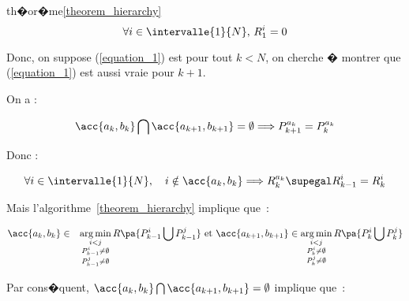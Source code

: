 \begin{xdemo}{th�or�me}{\ref{theorem_hierarchy}}
    $$
    \forall i \in \intervalle{1}{N}, \, R_{1}^i = 0
    $$

Donc, on suppose (\ref{equation_1}) est pour tout $k < N$, on cherche � montrer que (\ref{equation_1}) est aussi vraie pour $k+1$.


\itemdemo
\quad 
{}

On a :

    $$
    \acc{a_k,b_k} \bigcap \acc{a_{k+1},b_{k+1}} = \emptyset \Longrightarrow P_{k+1}^{a_{k}} = P_{k}^{a_{k}}
    $$

Donc :

    \begin{eqnarray}
    \forall i \in \intervalle{1}{N}, \, && 
                             i \notin \acc{a_k,b_k} \Longrightarrow R_k^{a_k} \supegal R_{k-1}^{i} = R_{k}^{i} 
                              \label{equation_2}
    \end{eqnarray}

Mais l'algorithme~\ref{theorem_hierarchy} implique que~:

    \begin{eqnarray*}
    \acc{a_k,b_k} &\in& \underset{  \begin{subarray}{c} i < j \\ P_{k-1}^i \neq \emptyset \\ P_{k-1}^j \neq
    \emptyset\end{subarray} }
            {\arg \min} \, R\pa{P_{k-1}^i \bigcup P_{k-1}^j} \text{ et }
    \acc{a_{k+1},b_{k+1}} \in \underset{  \begin{subarray}{c} i < j \\ P_{k}^i \neq \emptyset \\ P_{k}^j \neq
    \emptyset\end{subarray} }
            {\arg \min} \, R\pa{P_{k}^i \bigcup P_{k}^j}
    \end{eqnarray*}

Par cons�quent, $\acc{a_k,b_k} \bigcap \acc{a_{k+1},b_{k+1}} = \emptyset$ implique que~:


\end{xdemo}
